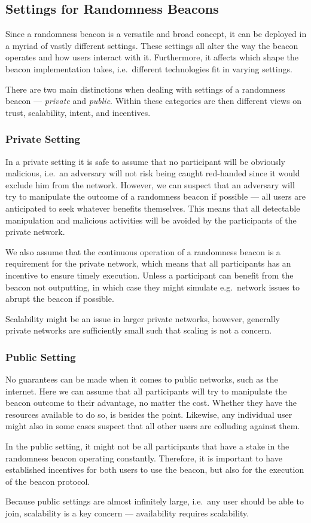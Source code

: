 \subsection{Settings for Randomness Beacons}
Since a randomness beacon is a versatile and broad concept, it can be deployed in a myriad of vastly different settings.
These settings all alter the way the beacon operates and how users interact with it.
Furthermore, it affects which shape the beacon implementation takes, i.e.\ different technologies fit in varying settings.

There are two main distinctions when dealing with settings of a randomness beacon --- \emph{private} and \emph{public}.
Within these categories are then different views on trust, scalability, intent, and incentives.

\subsubsection{Private Setting}
In a private setting it is safe to assume that no participant will be obviously malicious, i.e.\ an adversary will not risk being caught red-handed since it would exclude him from the network.
However, we can suspect that an adversary will try to manipulate the outcome of a randomness beacon if possible --- all users are anticipated to seek whatever benefits themselves.
This means that all detectable manipulation and malicious activities will be avoided by the participants of the private network.

We also assume that the continuous operation of a randomness beacon is a requirement for the private network, which means that all participants has an incentive to ensure timely execution.
Unless a participant can benefit from the beacon not outputting, in which case they might simulate e.g.\ network issues to abrupt the beacon if possible.

Scalability might be an issue in larger private networks, however, generally private networks are sufficiently small such that scaling is not a concern.

\subsubsection{Public Setting}
No guarantees can be made when it comes to public networks, such as the internet.
Here we can assume that all participants will try to manipulate the beacon outcome to their advantage, no matter the cost.
Whether they have the resources available to do so, is besides the point.
Likewise, any individual user might also in some cases suspect that all other users are colluding against them.

In the public setting, it might not be all participants that have a stake in the randomness beacon operating constantly.
Therefore, it is important to have established incentives for both users to use the beacon, but also for the execution of the beacon protocol.

Because public settings are almost infinitely large, i.e.\ any user should be able to join, scalability is a key concern --- availability requires scalability.


